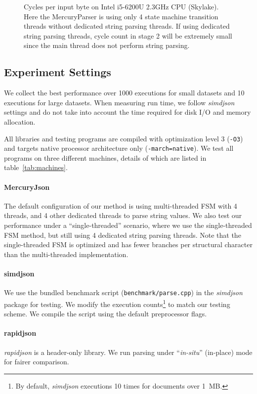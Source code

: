 \documentclass[11pt]{article}
\begin{document}
\begin{figure}
\begin{tikzpicture}
    \end{tikzpicture}
    \caption{Cycles per input byte on Intel i5-6200U 2.3GHz CPU (Skylake). Here the MercuryParser is using only 4 state machine transition threads without dedicated string parsing threads. If using dedicated string parsing threads, cycle count in stage 2 will be extremely small since the main thread does not perform string parsing.}
    \label{fig:my_label}
\end{figure}


\subsection{Experiment Settings}

We collect the best performance over 1000 executions for small datasets and 10 executions for large datasets. When measuring run time, we follow \textit{simdjson} settings and do not take into account the time required for disk I/O and memory allocation.

All libraries and testing programs are compiled with optimization level 3 (\texttt{-O3}) and targets native processor architecture only (\texttt{-march=native}). We test all programs on three different machines, details of which are listed in table~\ref{tab:machines}.

\paragraph{MercuryJson} The default configuration of our method is using multi-threaded FSM with 4 threads, and 4 other dedicated threads to parse string values. We also test our performance under a ``single-threaded'' scenario, where we use the single-threaded FSM method, but still using 4 dedicated string parsing threads. Note that the single-threaded FSM is optimized and has fewer branches per structural character than the multi-threaded implementation.

\paragraph{simdjson} We use the bundled benchmark script (\texttt{benchmark/parse.cpp}) in the \textit{simdjson} package for testing. We modify the execution counts\footnote{By default, \textit{simdjson} executions 10 times for documents over \SI{1}{MB}.} to match our testing scheme. We compile the script using the default preprocessor flags.

\paragraph{rapidjson} \textit{rapidjson} is a header-only library. We run parsing under ``\textit{in-situ}'' (in-place) mode for fairer comparison.
\end{document}

